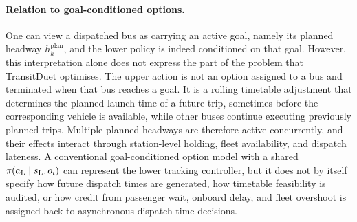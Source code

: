 \paragraph{Relation to goal-conditioned options.}
One can view a dispatched bus as carrying an active goal, namely its planned headway $h^{\mathrm{plan}}_k$, and the lower policy is indeed conditioned on that goal.
However, this interpretation alone does not express the part of the problem that TransitDuet optimises.
The upper action is not an option assigned to a bus and terminated when that bus reaches a goal. It is a rolling timetable adjustment that determines the planned launch time of a future trip, sometimes before the corresponding vehicle is available, while other buses continue executing previously planned trips.
Multiple planned headways are therefore active concurrently, and their effects interact through station-level holding, fleet availability, and dispatch lateness.
A conventional goal-conditioned option model with a shared $\pi(a_{\mathrm{L}}\mid s_{\mathrm{L}},o_i)$ can represent the lower tracking controller, but it does not by itself specify how future dispatch times are generated, how timetable feasibility is audited, or how credit from passenger wait, onboard delay, and fleet overshoot is assigned back to asynchronous dispatch-time decisions.
